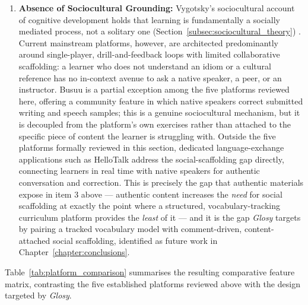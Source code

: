 \begin{enumerate}
        \item \textbf{Absence of Sociocultural Grounding:} Vygotsky's sociocultural account of cognitive development holds that learning is fundamentally a socially mediated process, not a solitary one (Section~\ref{subsec:sociocultural_theory}) \cite{vygotsky1978mind, lantolf2000sociocultural}. Current mainstream platforms, however, are architected predominantly around single-player, drill-and-feedback loops with limited collaborative scaffolding: a learner who does not understand an idiom or a cultural reference has no in-context avenue to ask a native speaker, a peer, or an instructor. Busuu is a partial exception among the five platforms reviewed here, offering a community feature in which native speakers correct submitted writing and speech samples; this is a genuine sociocultural mechanism, but it is decoupled from the platform's own exercises rather than attached to the specific piece of content the learner is struggling with. Outside the five platforms formally reviewed in this section, dedicated language-exchange applications such as HelloTalk \cite{hellotalk2026} address the social-scaffolding gap directly, connecting learners in real time with native speakers for authentic conversation and correction. This is precisely the gap that authentic materials expose in item 3 above --- authentic content increases the \emph{need} for social scaffolding at exactly the point where a structured, vocabulary-tracking curriculum platform provides the \emph{least} of it --- and it is the gap \textit{Glosy} targets by pairing a tracked vocabulary model with comment-driven, content-attached social scaffolding, identified as future work in Chapter~\ref{chapter:conclusions}.
    \end{enumerate}

    Table~\ref{tab:platform_comparison} summarises the resulting comparative feature matrix, contrasting the five established platforms reviewed above with the design targeted by \textit{Glosy}.

